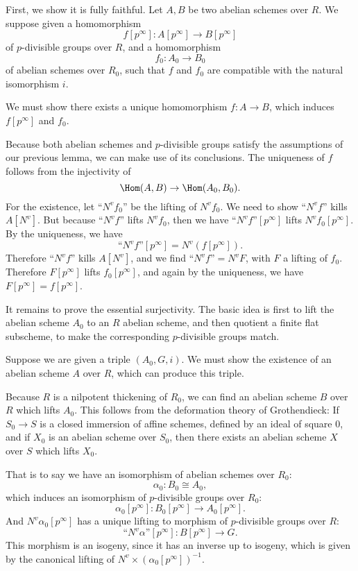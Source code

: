 \documentclass[twoside]{article}
\begin{document}
\pf
    First, we show it is fully faithful.
    Let $A,B$ be two abelian schemes over $R$.
    We suppose given a homomorphism 
    \[   f[p^{\infty}] \colon    A[p^{\infty}] \to B[p^{\infty}]    \]
    of $p$-divisible groups over $R$, and a homomorphism 
    \[   f_{0}\colon    A_{0} \to B_{0}    \]
    of abelian schemes over $R_{0}$,
    such that $f$ and $f_{0}$ are compatible with the natural isomorphism $i$.

    We must show there exists a unique homomorphism $f\colon  A\to B$, which induces $f[p^{\infty}]$ and $f_{0}$.

    Because both abelian schemes and $p$-divisible groups 
    satisfy the assumptions of our previous lemma,
    we can make use of its conclusions.
    The uniqueness of $f$ follows from the injectivity of 
    \[    \Hom(A,B) \to \Hom(A_{0},B_{0}).   \]
    For the existence, let $\text{``}N^{v}f_{0}\text{''}$ be the lifting of $N^{v}f_{0}$.
    We need to show $\text{``}N^{v}f\text{''}$ kills $A[N^{v}]$.
    But because $\text{``}N^{v}f\text{''}$ lifts $N^{v}f_{0}$, 
    then we have $\text{``}N^{v}f\text{''}[p^{\infty}]$ lifts $N^{v}f_{0}[p^{\infty}]$.
    By the uniqueness, we have 
    \[     \text{``}N^{v}f\text{''}[p^{\infty}]=N^{v}(f[p^{\infty}]).  \]
    Therefore $\text{``}N^{v}f\text{''}$ kills $A[N^{v}]$,
    and we find $\text{``}N^{v}f\text{''}=N^{v}F$,
    with $F$ a lifting of $f_{0}$.
    Therefore $F[p^{\infty}]$ lifts $f_{0}[p^{\infty}]$,
    and again by the uniqueness, we have $F[p^{\infty}]=f[p^{\infty}]$.

    It remains to  prove the essential surjectivity.
    The basic idea is first to lift the abelian scheme $A_{0}$ to an $R$ abelian scheme,
    and then  quotient a finite flat subscheme, to make the corresponding $p$-divisible groups match.

    Suppose we are given a triple $(A_{0},G,i)$.
    We must show the existence of an abelian scheme $A$ over $R$,
    which can produce this triple.

    Because $R$ is a nilpotent thickening of $R_0$,
    we can find an abelian scheme $B$ over $R$ which lifts $A_{0}$.
    This follows from the deformation theory of Grothendieck:
    If $S_{0}\to S$ is a closed immersion of affine schemes,
    defined by an ideal of square $0$, and if $X_{0}$ is an abelian scheme over $S_{0}$,
    then there exists an abelian scheme $X$ over $S$ which lifts $X_{0}$.

    That is to say we have an isomorphism of abelian schemes over $R_{0}$:
    \[  \alpha_{0}\colon   B_{0} \cong  A_{0} ,  \]
    which induces an isomorphism of $p$-divisible groups over $R_{0}$:
    \[  \alpha_{0}[p^{\infty}] \colon    B_{0}[p^{\infty}]     \to A_{0}[p^{\infty}] .  \]
    And $N^{v}\alpha_{0}[p^{\infty}]$ has a unique lifting to morphism of $p$-divisible groups over $R$:
    \[  \text{``}N^{v}\alpha\text{''}[p^{\infty}] \colon B[p^{\infty}]  \to G . \]
    This morphism is an isogeny, since it has an inverse up to isogeny,
    which is given by the canonical lifting of $N^{v}\times (\alpha_{0}[p^{\infty}])^{-1}$.
\end{document}
